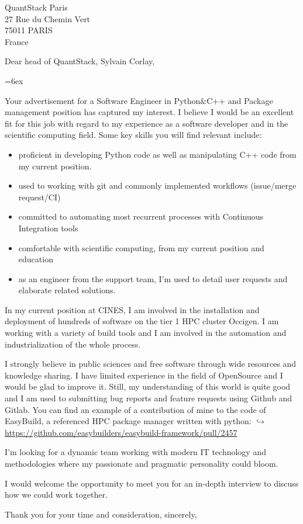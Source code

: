 \documentclass[10pt,a4paper]{lettre}
\begin{document}
\begin{letter}{QuantStack Paris\\27 Rue du Chemin Vert\\75011 PARIS\\France}
\address{Victor Cameo Ponz\\3 rue Tour Gayraud\\34 070 Montpellier}
\nofax

\opening{Dear head of QuantStack, Sylvain Corlay,}

\parindent=6ex

Your advertisement for a Software Engineer in Python\&C++ and Package
management position has captured my interest. I believe I would be an excellent
fit for this job with regard to my experience as a software developer and in the
scientific computing field. Some key skills you will find relevant include:

\begin{itemize}
    \item proficient in developing Python code as well as manipulating C++ code from my
current position.
    \item used to working with git and commonly implemented workflows (issue/merge
request/CI)
    \item committed to automating most recurrent processes with Continuous Integration
tools
    \item comfortable with scientific computing, from my current position and education
    \item as an engineer from the support team, I'm used to detail user requests and
elaborate related solutions.
\end{itemize}


In my current position at CINES, I am involved in the installation and deployment
of hundreds of software on the tier 1 HPC cluster Occigen. I am working with
a variety of build tools and I am involved in the automation and industrialization
of the whole process.

I strongly believe in public sciences and free software through wide resources and
knowledge sharing. I have limited experience in the field of OpenSource and I
would be glad to improve it. Still, my understanding of this world is quite good
and I am used to submitting bug reports and feature requests using Github and Gitlab.
You can find an example of a contribution of mine to the code of EasyBuild, a
referenced HPC package manager written with python:
\href{https://github.com/easybuilders/easybuild-framework/pull/2457}
{$\hookrightarrow$ https://github.com/easybuilders/easybuild-framework/pull/2457}

I'm looking for a dynamic team working with modern IT technology and
methodologies where my passionate and pragmatic personality could bloom.

I would welcome the opportunity to meet you for an in-depth interview to discuss
how we could work together.

\closing{Thank you for your time and consideration, sincerely,}
\end{letter}
\end{document}
